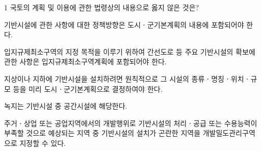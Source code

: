 \begin{question}{1}
국토의 계획 및 이용에 관한 법령상의 내용으로 옳지 않은 것은?
\begin{choices}
  \item 기반시설에 관한 사항에 대한 정책방향은 도시ㆍ군기본계획의 내용에 포함되어야 한다.
  \item 입지규제최소구역의 지정 목적을 이루기 위하여 간선도로 등 주요 기반시설의 확보에 관한 사항은 입지규제최소구역계획에 포함되어야 한다.
  \item 지상이나 지하에 기반시설을 설치하려면 원칙적으로 그 시설의 종류ㆍ명칭ㆍ위치ㆍ규모 등을 미리 도시ㆍ군기본계획으로 결정하여야 한다.
  \item 녹지는 기반시설 중 공간시설에 해당한다.
  \item 주거ㆍ상업 또는 공업지역에서의 개발행위로 기반시설의 처리ㆍ공급 또는 수용능력이 부족할 것으로 예상되는 지역 중 기반시설의 설치가 곤란한 지역을 개발밀도관리구역으로 지정할 수 있다.
\end{choices}
\end{question}
